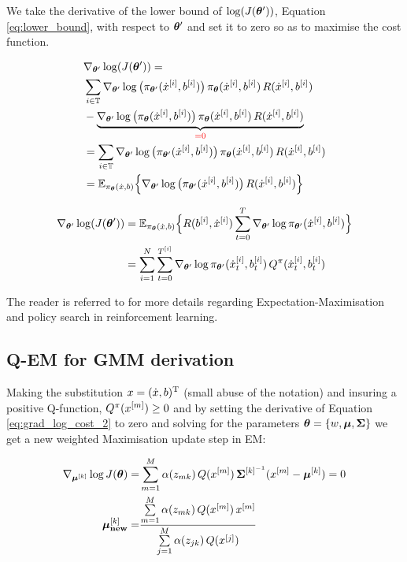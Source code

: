 We take the derivative of the lower bound of $\log(J(\boldsymbol{\theta}'))$, Equation \ref{eq:lower_bound}, with respect to $\boldsymbol{\theta}'$ and set it to 
zero so as to maximise the cost function.

\begin{align}
 &\nabla_{\boldsymbol{\theta}'}  \log( J(\boldsymbol{\theta}') ) = \nonumber\\
 &\sum_{i \in \mathbb{T}} \nabla_{\boldsymbol{\theta}'} \log\big( \pi_{\boldsymbol{\theta}'}(\dot{x}^{[i]},b^{[i]})\big) \, \pi_{\boldsymbol{\theta}}(\dot{x}^{[i]},b^{[i]}) \, R(\dot{x}^{[i]},b^{[i]}) \nonumber \\
				    & - \underbrace{ \nabla_{\boldsymbol{\theta}'} \log\big( \pi_{\boldsymbol{\theta}}(\dot{x}^{[i]},b^{[i]})\big) \, \pi_{\boldsymbol{\theta}}(\dot{x}^{[i]},b^{[i]}) \, R(\dot{x}^{[i]},b^{[i]})}_{\color{red} =0} \nonumber \\
				    &= \sum_{i \in \mathbb{T}} \nabla_{\boldsymbol{\theta}'} \log\big( \pi_{\boldsymbol{\theta}'}(\dot{x}^{[i]},b^{[i]})\big) \, \pi_{\boldsymbol{\theta}}(\dot{x}^{[i]},b^{[i]}) \, R(\dot{x}^{[i]},b^{[i]}) \nonumber \\
				    &= \mathbb{E}_{\pi_{\boldsymbol{\theta}}(\dot{x},b)} \Big\{ \nabla_{\boldsymbol{\theta}'} \log\big( \pi_{\boldsymbol{\theta}'}(\dot{x}^{[i]},b^{[i]})\big)\, R(\dot{x}^{[i]},b^{[i]}) \Big\}
\end{align}

\begin{align}
 \nabla_{\boldsymbol{\theta}'}  \log( J(\boldsymbol{\theta}') ) &= \mathbb{E}_{\pi_{\boldsymbol{\theta}}(\dot{x},b)}\Big\{R(b^{[i]},\dot{x}^{[i]})  \sum_{t=0}^{T}\nabla_{\boldsymbol{\theta}'}\log \pi_{\boldsymbol{\theta}'}(\dot{x}^{[i]},b^{[i]})\Big\}\\
				    &= \sum\limits_{i=1}^{N} \sum\limits_{t=0}^{T^{[i]}} \nabla_{\boldsymbol{\theta}'}\log \pi_{\boldsymbol{\theta}'}(\dot{x}^{[i]}_t,b^{[i]}_t) \, Q^{\pi}(\dot{x}^{[i]}_t,b^{[i]}_t) \label{eq:grad_log_cost_2}
\end{align}

The reader is referred to \cite{rl_gradient_survey_2013} for more details regarding Expectation-Maximisation and policy search in reinforcement learning.

\subsection{Q-EM for GMM derivation}\label{app:grad}

Making the substitution $x = (\dot{x},b)^{\mathrm{T}}$ (small abuse of the notation) and  insuring a positive Q-function, $Q^{\pi}(x^{[m]}) \geq 0$
and by setting the derivative of Equation \ref{eq:grad_log_cost_2} to zero and solving for the parameters
$\boldsymbol{\theta}=\{w,\boldsymbol{\mu},\boldsymbol{\Sigma}\}$ we get a new weighted Maximisation update step in EM:

\begin{align}
\nabla_{\boldsymbol{\mu}^{[k]}} \log J(\boldsymbol{\theta}) =& \sum\limits_{m=1}^{M} \alpha(z_{mk})\, Q(x^{[m]})\, \boldsymbol{\Sigma}^{[k]^{-1}} (x^{[m]} - \boldsymbol{\mu}^{[k]}) = 0 \nonumber \\
			 \boldsymbol{\mu}^{[k]}_{\textrm{\textbf{new}}} =& \frac{\sum\limits_{m=1}^{M} \alpha(z_{mk})\, Q(x^{[m]})\, x^{[m]} }{\sum\limits_{j=1}^{M} \alpha(z_{jk})\, Q(x^{[j]})}
\end{align}

